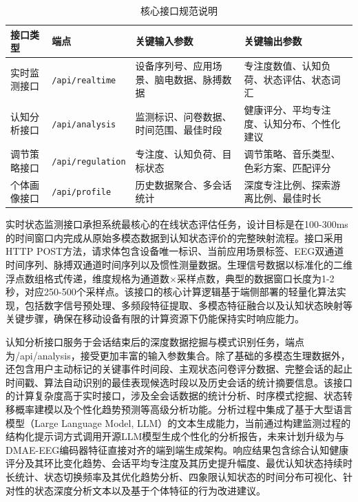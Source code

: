 \begin{table}[htbp]
\centering
\caption{核心接口规范说明}
\label{tab:6-4}
\begin{tabular}{>{\centering\arraybackslash}m{2.5cm}
>{\centering\arraybackslash}m{3cm}
>{\centering\arraybackslash}m{4cm}
>{\centering\arraybackslash}m{4cm}}
\toprule
接口类型 & 端点 & 关键输入参数 & 关键输出参数  \\
\midrule
实时监测接口 & \texttt{/api/realtime} & 设备序列号、应用场景、脑电数据、脉搏数据 & 专注度数值、认知负荷、状态评估、状态词汇 \\
\midrule
认知分析接口 & \texttt{/api/analysis} & 监测标识、问卷数据、时间范围、最佳时段 & 健康评分、平均专注度、认知分布、个性化建议  \\
\midrule
调节策略接口 & \texttt{/api/regulation} & 专注度、认知负荷、目标状态 & 调节策略、音乐类型、色彩方案、匹配评分  \\
\midrule
个体画像接口 & \texttt{/api/profile} & 历史数据聚合、多会话统计 & 深度专注比例、探索游离比例、最佳时长  \\
\bottomrule
\end{tabular}%
\end{table}

实时状态监测接口承担系统最核心的在线状态评估任务，设计目标是在100-300ms的时间窗口内完成从原始多模态数据到认知状态评价的完整映射流程。接口采用HTTP POST方法，请求体包含设备唯一标识、当前应用场景标签、EEG双通道时间序列、脉搏双通道时间序列以及惯性测量数据。生理信号数据以标准化的二维浮点数组格式传递，维度规格为通道数×采样点数，典型的数据窗口长度为1-2秒，对应250-500个采样点。该接口的核心计算逻辑基于端侧部署的轻量化算法实现，包括数字信号预处理、多频段特征提取、多模态特征融合以及认知状态映射等关键步骤，确保在移动设备有限的计算资源下仍能保持实时响应能力。

认知分析接口服务于会话结束后的深度数据挖掘与模式识别任务，端点为/api/analysis，接受更加丰富的输入参数集合。除了基础的多模态生理数据外，还包含用户主动标记的关键事件时间段、主观状态问卷评分数据、完整会话的起止时间戳、算法自动识别的最佳表现候选时段以及历史会话的统计摘要信息。该接口的计算复杂度高于实时接口，涉及全会话数据的统计分析、时序模式挖掘、状态转移概率建模以及个性化趋势预测等高级分析功能。分析过程中集成了基于大型语言模型（Large Language Model, LLM）的文本生成能力，当前通过构建监测过程的结构化提示词方式调用开源LLM模型生成个性化的分析报告\cite{zhang2024llama}，未来计划升级为与DMAE-EEG编码器特征直接对齐的端到端生成架构。响应结果包含综合认知健康评分及其环比变化趋势、会话平均专注度及其历史提升幅度、最优认知状态持续时长统计、状态切换频率及其优化趋势分析、四象限认知状态的时间分布可视化、针对性的状态深度分析文本以及基于个体特征的行为改进建议。

